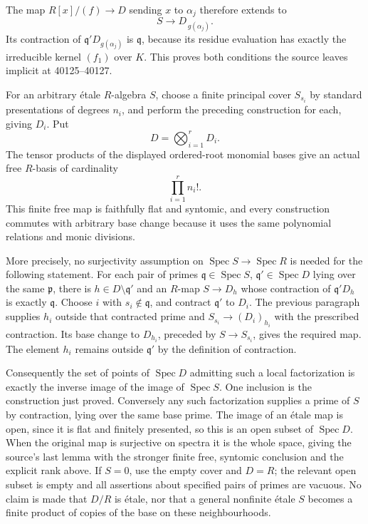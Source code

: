 The map \(R[x]/(f)\to D\) sending \(x\) to \(\alpha_j\) therefore extends to \[
S\longrightarrow D_{\,g(\alpha_j)}.
\] Its contraction of \(\mathfrak q'D_{g(\alpha_j)}\) is \(\mathfrak q\), because its residue evaluation has exactly the irreducible kernel \((f_1)\) over \(K\). This proves both conditions the source leaves implicit at 40125--40127.

For an arbitrary étale \(R\)-algebra \(S\), choose a finite principal cover \(S_{s_i}\) by standard presentations of degrees \(n_i\), and perform the preceding construction for each, giving \(D_i\). Put \[
D=\bigotimes_{i=1}^r D_i.
\] The tensor products of the displayed ordered-root monomial bases give an actual free \(R\)-basis of cardinality \[
\prod_{i=1}^r n_i!.
\] This finite free map is faithfully flat and syntomic, and every construction commutes with arbitrary base change because it uses the same polynomial relations and monic divisions.

More precisely, no surjectivity assumption on \(\operatorname{Spec}S\to\operatorname{Spec}R\) is needed for the following statement. For each pair of primes \(\mathfrak q\in\operatorname{Spec}S\), \(\mathfrak q'\in\operatorname{Spec}D\) lying over the same \(\mathfrak p\), there is \(h\in D\setminus\mathfrak q'\) and an \(R\)-map \(S\to D_h\) whose contraction of \(\mathfrak q'D_h\) is exactly \(\mathfrak q\). Choose \(i\) with \(s_i\notin\mathfrak q\), and contract \(\mathfrak q'\) to \(D_i\). The previous paragraph supplies \(h_i\) outside that contracted prime and \(S_{s_i}\to(D_i)_{h_i}\) with the prescribed contraction. Its base change to \(D_{h_i}\), preceded by \(S\to S_{s_i}\), gives the required map. The element \(h_i\) remains outside \(\mathfrak q'\) by the definition of contraction.

Consequently the set of points of \(\operatorname{Spec}D\) admitting such a local factorization is exactly the inverse image of the image of \(\operatorname{Spec}S\). One inclusion is the construction just proved. Conversely any such factorization supplies a prime of \(S\) by contraction, lying over the same base prime. The image of an étale map is open, since it is flat and finitely presented, so this is an open subset of \(\operatorname{Spec}D\). When the original map is surjective on spectra it is the whole space, giving the source's last lemma with the stronger finite free, syntomic conclusion and the explicit rank above. If \(S=0\), use the empty cover and \(D=R\); the relevant open subset is empty and all assertions about specified pairs of primes are vacuous. No claim is made that \(D/R\) is étale, nor that a general nonfinite étale \(S\) becomes a finite product of copies of the base on these neighbourhoods.


